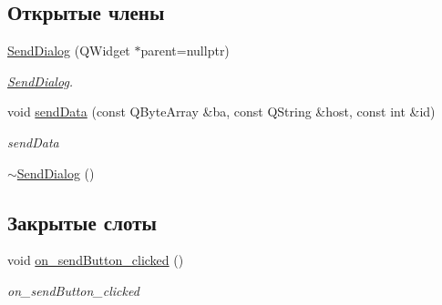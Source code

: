 \subsection*{Открытые члены}
\begin{DoxyCompactItemize}
\item 
\hyperlink{classSendDialog_a4bfe5b37d110edee9e324c138aaf1377}{Send\+Dialog} (Q\+Widget $\ast$parent=nullptr)
\begin{DoxyCompactList}\small\item\em \hyperlink{classSendDialog}{Send\+Dialog}. \end{DoxyCompactList}\item 
void \hyperlink{classSendDialog_a66420c8a246b7aa3c466087e655ff0ea}{send\+Data} (const Q\+Byte\+Array \&ba, const Q\+String \&host, const int \&id)
\begin{DoxyCompactList}\small\item\em send\+Data \end{DoxyCompactList}\item 
\hyperlink{classSendDialog_af374a7a7ccd8b4dcdd0d567ce72c04a3}{$\sim$\+Send\+Dialog} ()
\end{DoxyCompactItemize}
\subsection*{Закрытые слоты}
\begin{DoxyCompactItemize}
\item 
void \hyperlink{classSendDialog_a542483b8bf0dd1230e060e217d58d468}{on\+\_\+send\+Button\+\_\+clicked} ()
\begin{DoxyCompactList}\small\item\em on\+\_\+send\+Button\+\_\+clicked \end{DoxyCompactList}\end{DoxyCompactItemize}
